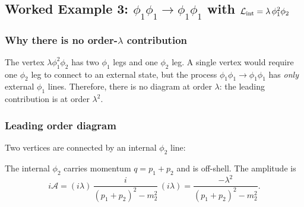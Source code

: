 \documentclass[../main.tex]{subfiles}
\begin{document}
\subsection*{Worked Example 3: $\phi_1\phi_1 \to \phi_1\phi_1$ with $\mathcal{L}_{\rm int} = \lambda\,\phi_1^2\phi_2$}

\subsubsection*{Why there is no order-$\lambda$ contribution}

The vertex $\lambda\phi_1^2\phi_2$ has two $\phi_1$ legs and one $\phi_2$ leg.  A single vertex would require one $\phi_2$ leg to connect to an external state, but the process $\phi_1\phi_1 \to \phi_1\phi_1$ has \emph{only} external $\phi_1$ lines.  Therefore, there is no diagram at order $\lambda$: the leading contribution is at order $\lambda^2$.

\subsubsection*{Leading order diagram}

Two vertices are connected by an internal $\phi_2$ line:

\begin{center}
\end{center}

The internal $\phi_2$ carries momentum $q = p_1 + p_2$ and is off-shell.  The amplitude is
\begin{equation}
  i\mathcal{A}
  = (i\lambda)\,\frac{i}{(p_1+p_2)^2 - m_2^2}\,(i\lambda)
  = \frac{-\lambda^2}{(p_1+p_2)^2 - m_2^2}.
  \label{eq:lec05:phi12-phi2}
\end{equation}
\end{document}
